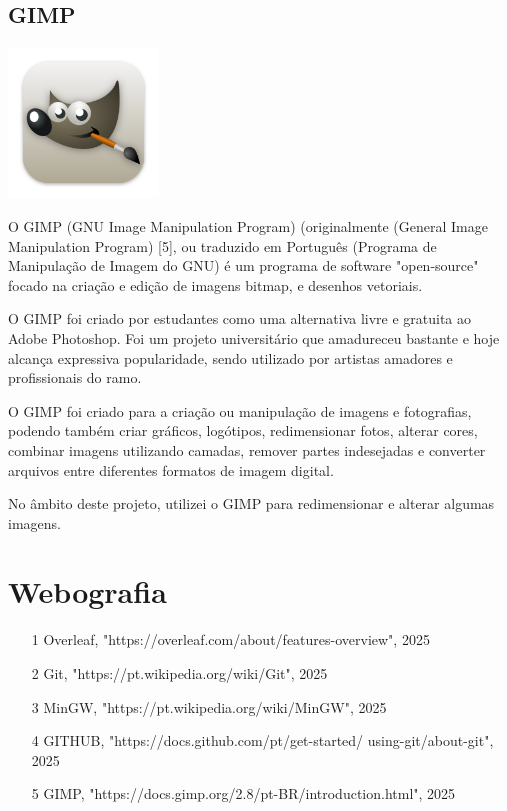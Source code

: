 \documentclass[a4paper,12pt]{article}
\begin{document}
\newpage

\subsection{GIMP}
    \includegraphics[width=0.3\textwidth]{gimp.png} %
    \vspace{0.5cm}

O GIMP (GNU Image Manipulation Program) (originalmente (General Image Manipulation Program) [5], ou traduzido em Português (Programa de Manipulação de Imagem do GNU) é um programa de software "open-source" focado na criação e edição de imagens bitmap, e desenhos vetoriais.

O GIMP foi criado por estudantes como uma alternativa livre e gratuita ao Adobe Photoshop. Foi um projeto universitário que amadureceu bastante e hoje alcança expressiva popularidade, sendo utilizado por artistas amadores e profissionais do ramo.

O GIMP foi criado para a criação ou manipulação de imagens e fotografias, podendo também criar gráficos, logótipos, redimensionar fotos, alterar cores, combinar imagens utilizando camadas, remover partes indesejadas e converter arquivos entre diferentes formatos de imagem digital.

No âmbito deste projeto, utilizei o GIMP para redimensionar e alterar algumas imagens.

\newpage

\section{Webografia}
\begin{itemize}
    \item [1] Overleaf, "https://overleaf.com/about/features-overview", 2025

    \item [2] Git, "https://pt.wikipedia.org/wiki/Git", 2025

    \item [3] MinGW, "https://pt.wikipedia.org/wiki/MinGW", 2025
    
    \item [4] GITHUB, "https://docs.github.com/pt/get-started/
    \newline
    using-git/about-git", 2025
    
    \item [5] GIMP, "https://docs.gimp.org/2.8/pt-BR/introduction.html", 2025
    
\end{itemize}
\end{document}
